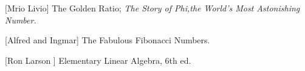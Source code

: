\documentclass[paper=a4, fontsize=11pt,twoside]{scrartcl}		%
\theoremstyle{definition}
\theoremstyle{remark}
\begin{document}
\newpage

\begin{thebibliography}{9}

[Mrio Livio]
The Golden Ratio; \textit{The Story of Phi,the World's Most Astonishing Number.}

[Alfred and Ingmar]
The Fabulous Fibonacci Numbers.

[Ron Larson ]
Elementary Linear Algebra, 6th ed.

\end{thebibliography}
\end{document}
